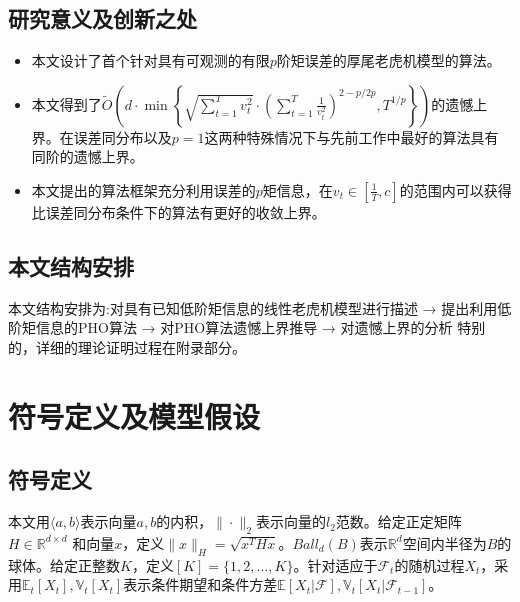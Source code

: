 \documentclass[UTF8,a4paper,10.5pt]{ctexart}
\newcommand{\Fcal}{\mathcal F}
\newcommand{\E}{\mathbb{E}}
\newcommand{\V}{\mathbb{V}}
\newcommand{\R}{\mathbb{R}}
\begin{document}
\subsection{研究意义及创新之处}
\begin{itemize}
	\item 本文设计了首个针对具有可观测的有限$p$阶矩误差的厚尾老虎机模型的算法。
	\item 本文得到了$ \tilde{O}\left(d\cdot\min \left\{\sqrt{\sum_{t=1}^{T}v_t^2}\cdot \left(\sum_{t=1}^{T}\frac{1}{v_t^2}\right)^{2-p/2p} ,T^{1/p}\right\}\right)$的遗憾上界。在误差同分布以及$p=1$这两种特殊情况下与先前工作中最好的算法具有同阶的遗憾上界。
	\item 本文提出的算法框架充分利用误差的$p$矩信息，在$v_t\in [\frac{1}{T},c]$的范围内可以获得比误差同分布条件下的算法有更好的收敛上界。
\end{itemize}
\subsection{本文结构安排}
本文结构安排为:对具有已知低阶矩信息的线性老虎机模型进行描述 → 提出利用低阶矩信息的PHO算法 → 对PHO算法遗憾上界推导 → 对遗憾上界的分析 特别的，详细的理论证明过程在附录部分。

\section{符号定义及模型假设}
\subsection{符号定义}
本文用$\langle a,b \rangle$表示向量$a,b$的内积，$\|\cdot\|_2$表示向量的$l_2$范数。给定正定矩阵 $H\in \R^{d \times d}$ 和向量$x$，定义$\|x\|_H = \sqrt{x^THx}$。$Ball_d(B)$表示$\R^d$空间内半径为$B$的球体。给定正整数$K$，定义$[K] = \{1,2,\ldots,K\}$。针对适应于$\Fcal_t$的随机过程$X_t$，采用$\E_t[X_t],\V_t[X_t]$表示条件期望和条件方差$\E[X_t|\Fcal],\V_t[X_t|\Fcal_{t-1}]$。
\end{document}
